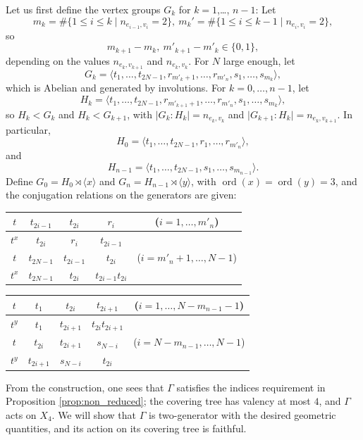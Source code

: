 \documentclass[12pt,leqno]{amsart}
\newcommand{\2}{L^2_{\rm per}(0, T)}
\newcommand{\ord}{{\operatorname{ord}}}
\numberwithin{equation}{section}
\numberwithin{figure}{section}
\begin{document}
Let us first define the vertex groups $G_k$ for $k=1$,\dots, $n-1$: Let
\[
    m_k = \#\{1\leq i\leq k\mid n_{e_{i-1},v_i} = 2\},\ m_k' = \#\{1\leq i\leq k-1\mid n_{e_{i},v_i} = 2\},
\]
so
\[
    m_{k+1}-m_k,\ m'_{k+1}-m'_k\in \{0,1\},
\]
depending on the values $n_{e_{k},v_{k+1}}$ and $n_{e_{k},v_{k}}$. For $N$ large enough, let
\[
    G_k = \langle t_1,\dots, t_{2N-1}, r_{m'_k+1},\dots, r_{m'_{n}}, s_1,\dots, s_{m_k}\rangle,
\]
which is Abelian and generated by involutions. For $k=0,\dots, n-1$, let
\[
    H_k = \langle t_1,\dots, t_{2N-1}, r_{m'_{k+1}+1},\dots, r_{m'_{n}}, s_1,\dots, s_{m_k}\rangle,
\]
so $H_k<G_k$ and $H_k<G_{k+1}$, with $\lvert G_k:H_k\rvert = n_{e_k,v_k}$ and $\lvert G_{k+1}:H_k\rvert = n_{e_k,v_{k+1}}$. In particular,
\[
    H_0 = \langle t_1,\dots, t_{2N-1}, r_{1},\dots, r_{m'_{n}}\rangle,
\]
and
\[
    H_{n-1} = \langle t_1,\dots, t_{2N-1}, s_1,\dots, s_{m_{n-1}}\rangle.
\]
Define $G_0 = H_0\rtimes\langle x\rangle$ and $G_n = H_{n-1}\rtimes \langle y\rangle$, with $\ord(x) = \ord(y) = 3$, and the conjugation relations on the generators are given:
    \begin{center}
        \begin{tabular}{c||c|c|cc}
            $t$ & $t_{2i-1}$ & $t_{2i}$ & $r_i$ & ($i=1,\dots, m'_{n}$) \\
            \hline
            $t^x$ & $t_{2i}$ & $r_i$ & $t_{2i-1}$\\
            \hline
            $t$ & $t_{2N-1}$ & $t_{2i-1}$ & $t_{2i}$ &($i=m'_{n}+1,\dots, N-1$) \\
            \hline
            $t^x$ & $t_{2N-1}$ & $t_{2i}$ & $t_{2i-1}t_{2i}$
        \end{tabular}
    \end{center}
    \begin{center}
        \begin{tabular}{c||c|c|cc}
            $t$ & $t_1$ & $t_{2i}$ & $t_{2i+1}$ & ($i=1
            ,\dots, N-m_{n-1}-1$) \\
            \hline
            $t^y$ & $t_1$ & $t_{2i+1}$ & $t_{2i}t_{2i+1}$ \\
            \hline
            $t$ & $t_{2i}$ & $t_{2i+1}$ & $s_{N-i}$ & ($i=N-m_{n-1},\dots, N-1$) \\
            \hline
            $t^y$ & $t_{2i+1}$ & $s_{N-i}$ & $t_{2i}$
        \end{tabular}
    \end{center}
From the construction, one sees that $\Gamma$ satisfies the indices requirement in Proposition \ref{prop:non_reduced}; the covering tree has valency at most $4$, and $\Gamma$ acts on $X_4$. We will show that $\Gamma$ is two-generator with the desired geometric quantities, and its action on its covering tree is faithful.
\end{document}
